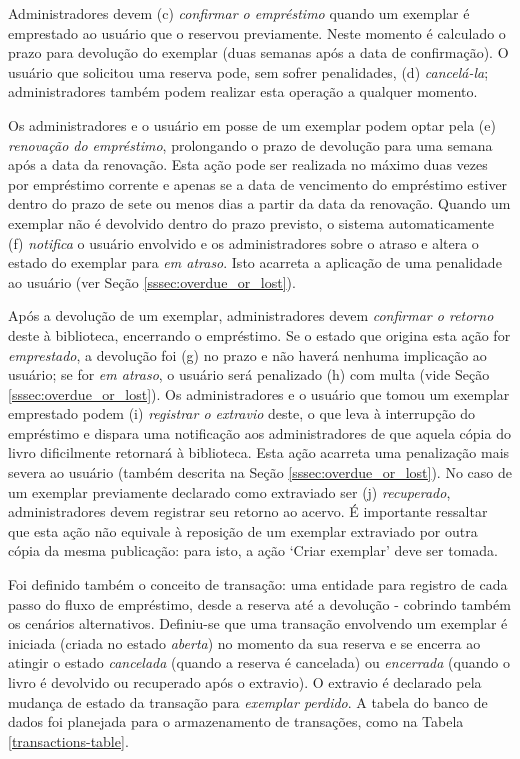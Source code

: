 \documentclass[a4paper]{article}
\begin{document}
Administradores devem (c) \textit{confirmar o empréstimo} quando um exemplar é emprestado ao usuário que o reservou previamente. Neste momento é calculado o prazo para devolução do exemplar (duas semanas após a data de confirmação). O usuário que solicitou uma reserva pode, sem sofrer penalidades, (d) \textit{cancelá-la}; administradores também podem realizar esta operação a qualquer momento.

Os administradores e o usuário em posse de um exemplar podem optar pela (e) \textit{renovação do empréstimo}, prolongando o prazo de devolução para uma semana após a data da renovação. Esta ação pode ser realizada no máximo duas vezes por empréstimo corrente e apenas se a data de vencimento do empréstimo estiver dentro do prazo de sete ou menos dias a partir da data da renovação. Quando um exemplar não é devolvido dentro do prazo previsto, o sistema automaticamente (f) \textit{notifica} o usuário envolvido e os administradores sobre o atraso e altera o estado do exemplar para \textit{em atraso}. Isto acarreta a aplicação de uma penalidade ao usuário (ver Seção \ref{sssec:overdue_or_lost}).

Após a devolução de um exemplar, administradores devem \textit{confirmar o retorno} deste à biblioteca, encerrando o empréstimo. Se o estado que origina esta ação for \textit{emprestado}, a devolução foi (g) no prazo e não haverá nenhuma implicação ao usuário; se for \textit{em atraso}, o usuário será penalizado (h) com multa (vide Seção \ref{sssec:overdue_or_lost}). Os administradores e o usuário que tomou um exemplar emprestado podem (i) \textit{registrar o extravio} deste, o que leva à interrupção do empréstimo e dispara uma notificação aos administradores de que aquela cópia do livro dificilmente retornará à biblioteca. Esta ação acarreta uma penalização mais severa ao usuário (também descrita na Seção \ref{sssec:overdue_or_lost}). No caso de um exemplar previamente declarado como extraviado ser (j) \textit{recuperado}, administradores devem registrar seu retorno ao acervo. É importante ressaltar que esta ação não equivale à reposição de um exemplar extraviado por outra cópia da mesma publicação: para isto, a ação ‘Criar exemplar’ deve ser tomada.

Foi definido também o conceito de transação: uma entidade para registro de cada passo do fluxo de empréstimo, desde a reserva até a devolução - cobrindo também os cenários alternativos. Definiu-se que uma transação envolvendo um exemplar é iniciada (criada no estado \textit{aberta}) no momento da sua reserva e se encerra ao atingir o estado \textit{cancelada} (quando a reserva é cancelada) ou \textit{encerrada} (quando o livro é devolvido ou recuperado após o extravio). O extravio é declarado pela mudança de estado da transação para \textit{exemplar perdido}. A tabela do banco de dados foi planejada para o armazenamento de transações, como na Tabela \ref{transactions-table}.
\end{document}
